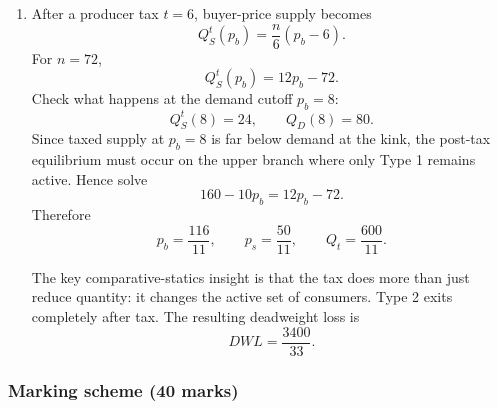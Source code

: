 \documentclass[12pt]{article}
\begin{document}
\begin{enumerate}[label=(\alph*)]
    Using the area formulas on the aggregate curves,
    \[
    \boxed{CS=\frac{89920}{243},\qquad PS=\frac{80000}{243}.}
    \]

    \item
    After a producer tax \(t=6\), buyer-price supply becomes
    \[
    Q_S^t(p_b)=\frac{n}{6}(p_b-6).
    \]
    For \(n=72\),
    \[
    Q_S^t(p_b)=12p_b-72.
    \]
    Check what happens at the demand cutoff \(p_b=8\):
    \[
    Q_S^t(8)=24,
    \qquad
    Q_D(8)=80.
    \]
    Since taxed supply at \(p_b=8\) is far below demand at the kink, the post-tax equilibrium must occur on the upper branch where only Type 1 remains active. Hence solve
    \[
    160-10p_b=12p_b-72.
    \]
    Therefore
    \[
    \boxed{p_b=\frac{116}{11},\qquad p_s=\frac{50}{11},\qquad Q_t=\frac{600}{11}.}
    \]

    The key comparative-statics insight is that the tax does more than just reduce quantity: it changes the active set of consumers. Type 2 exits completely after tax. The resulting deadweight loss is
    \[
    \boxed{DWL=\frac{3400}{33}.}
    \]
\end{enumerate}

\newpage
\subsubsection{Marking scheme (40 marks)}
\end{document}
